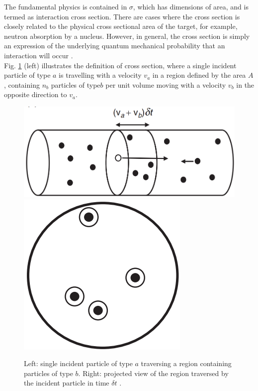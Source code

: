 The fundamental physics is contained in $\sigma$, which has dimensions of area, and is termed as interaction cross section. There are cases where the cross section is closely related to the physical cross sectional area of the target, for example, neutron absorption by a nucleus. However, in general, the cross section is simply an expression of the underlying quantum mechanical probability that an interaction will occur \cite{thomson_2013}.\\
Fig. \ref{cs_draw_1} (left) illustrates the definition of cross section, where a single incident particle of type $a$ is travelling with a velocity $v_{a}$ in a region defined by the area $A$, containing $n_{b}$ particles of type$ b$ per unit volume moving with a velocity $v_{b}$ in the opposite direction to $v_{a}$.

\begin{center}
  \begin{figure}[h!]
    \centering
    \includegraphics[scale=.25]{Chapter1/cs_draw_1.png} \includegraphics[scale=.25]{Chapter1/cs_draw_2.png}
    \caption[Cross section illustration]{Left: single incident particle of type $a$ traversing a region containing particles of type $b$. Right: projected view of the region traversed by the incident particle in time $\delta t$ \cite{thomson_2013}.}
    \label{cs_draw_1}
  \end{figure}
\end{center}


